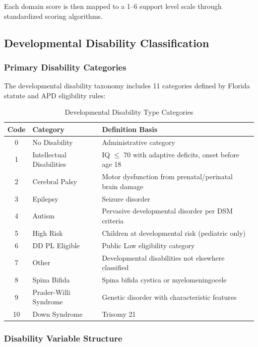 Each domain score is then mapped to a 1--6 support level scale through standardized scoring algorithms.

\subsection{Developmental Disability Classification}
\label{subsec:developmental-disability}

\subsubsection{Primary Disability Categories}

The developmental disability taxonomy includes 11 categories defined by Florida statute and APD eligibility rules:

\begin{table}[H]
\centering
\caption{Developmental Disability Type Categories}
\begin{tabular}{clp{6cm}}
\toprule
\textbf{Code} & \textbf{Category} & \textbf{Definition Basis} \\
\midrule
0 & No Disability & Administrative category \\
1 & Intellectual Disabilities & IQ $\leq$ 70 with adaptive deficits, onset before age 18 \\
2 & Cerebral Palsy & Motor dysfunction from prenatal/perinatal brain damage \\
3 & Epilepsy & Seizure disorder \\
4 & Autism & Pervasive developmental disorder per DSM criteria \\
5 & High Risk & Children at developmental risk (pediatric only) \\
6 & DD PL Eligible & Public Law eligibility category \\
7 & Other & Developmental disabilities not elsewhere classified \\
8 & Spina Bifida & Spina bifida cystica or myelomeningocele \\
9 & Prader-Willi Syndrome & Genetic disorder with characteristic features \\
10 & Down Syndrome & Trisomy 21 \\
\bottomrule
\end{tabular}
\label{tab:disability-types}
\end{table}

\subsubsection{Disability Variable Structure}

